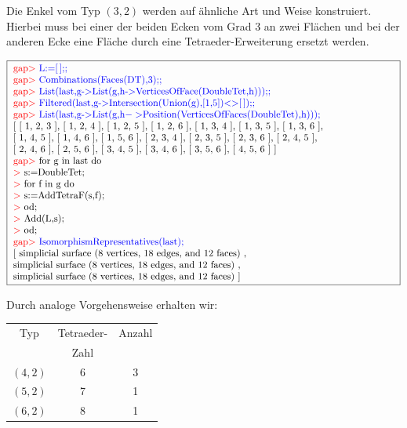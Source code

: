 \documentclass[12pt,titlepage,twoside,cleardoublepage]{article}
\theoremstyle{nummermitklammern}
\numberwithin{equation}{section}
\begin{document}
 Die Enkel vom Typ $(3,2)$ werden auf ähnliche Art und Weise konstruiert. Hierbei muss bei einer der beiden Ecken vom Grad 3 an zwei Flächen und bei der anderen Ecke eine Fläche durch eine Tetraeder-Erweiterung ersetzt werden.
 \begin{center}
 $\fbox{
\parbox{14cm}{
\textcolor{red}{gap$>$} \textcolor{blue}{L:=[\,];;}\newline
\textcolor{red}{gap$>$} \textcolor{blue}{Combinations(Faces(DT),3);;}\newline
\textcolor{red}{gap$>$} \textcolor{blue}{List(last,g-$>$List(g,h-$>$VerticesOfFace(DoubleTet,h)));;}\newline
\textcolor{red}{gap$>$} \textcolor{blue}{Filtered(last,g-$>$Intersection(Union(g),[1,5])$<>$[\,]);;}\newline
\textcolor{red}{gap$>$} \textcolor{blue}{List(last,g-$>$List(g,h$->$Position(VerticesOfFaces(DoubleTet),h)));}\newline
[ [ 1, 2, 3 ], [ 1, 2, 4 ], [ 1, 2, 5 ], [ 1, 2, 6 ], [ 1, 3, 4 ],
  [ 1, 3, 5 ], [ 1, 3, 6 ], \newline
  [ 1, 4, 5 ], [ 1, 4, 6 ], [ 1, 5, 6 ],
  [ 2, 3, 4 ], [ 2, 3, 5 ], [ 2, 3, 6 ], [ 2, 4, 5 ], 
 \newline
  [ 2, 4, 6 ], [ 2, 5, 6 ], [ 3, 4, 5 ], [ 3, 4, 6 ], [ 3, 5, 6 ], [ 4, 5, 6 ] ]\newline
\textcolor{red}{gap$>$} for g in last do\newline
\textcolor{red}{$>$} s:=DoubleTet;\newline
\textcolor{red}{$>$} for f in g do\newline
\textcolor{red}{$>$} s:=AddTetraF(s,f);\newline
\textcolor{red}{$>$} od;\newline
\textcolor{red}{$>$} Add(L,s);\newline
\textcolor{red}{$>$} od;\newline
\textcolor{red}{gap$>$} \textcolor{blue}{IsomorphismRepresentatives(last);}\newline
[ simplicial surface (8 vertices, 18 edges, and 12 faces)
    ,\newline
     simplicial surface (8 vertices, 18 edges, and 12 faces)
    ,\newline
  simplicial surface (8 vertices, 18 edges, and 12 faces)
 ]
}}$ 
\end{center}  
Durch analoge Vorgehensweise erhalten wir:
\begin{center}
\begin{tabular}{|c|c|c|}
\hline
 Typ&Tetraeder-  & Anzahl\\
&Zahl &\\
\hline
$(4,2)$&6& 3\\
\hline
$(5,2)$&7& 1\\
\hline
$(6,2)$&8& 1\\
\hline
\end{tabular}
\end{center}
\end{document}
